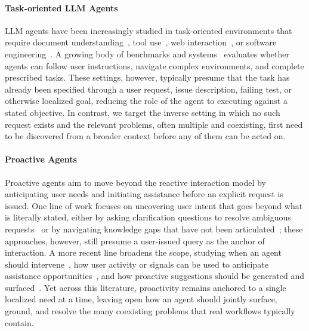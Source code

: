 \documentclass{llmxive}
\begin{document}
\paragraph{Task-oriented LLM Agents}
LLM agents have been increasingly studied in task-oriented environments that require document understanding~\cite{mmlongbench_doc}, tool use~\cite{Toolformer, ToolLLM}, web interaction~\cite{WebArena, Mind2Web}, or software engineering~\cite{SWE-agent, AutoCodeRover}. A growing body of benchmarks and systems~\cite{AgentBench, OSWorld} evaluates whether agents can follow user instructions, navigate complex environments, and complete prescribed tasks. These settings, however, typically presume that the task has already been specified through a user request, issue description, failing test, or otherwise localized goal, reducing the role of the agent to executing against a stated objective. In contrast, we target the inverse setting in which no such request exists and the relevant problems, often multiple and coexisting, first need to be discovered from a broader context before any of them can be acted on.

\paragraph{Proactive Agents}
Proactive agents aim to move beyond the reactive interaction model by anticipating user needs and initiating assistance before an explicit request is issued. One line of work focuses on uncovering user intent that goes beyond what is literally stated, either by asking clarification questions to resolve ambiguous requests~\cite{DBLP:conf/sigir/AliannejadiZCC19, Kuhn2022CLAMSC, DBLP:conf/emnlp/Zhang0RNC24, DBLP:journals/corr/abs-2511-02208, DiscoverLLM} or by navigating knowledge gaps that have not been articulated~\cite{proper}; these approaches, however, still presume a user-issued query as the anchor of interaction. A more recent line broadens the scope, studying when an agent should intervene~\cite{DBLP:conf/chi/LiuFSWIC25, DBLP:conf/emnlp/ZhangDLMKDCM25}, how user activity or signals can be used to anticipate assistance opportunities~\cite{ProactiveAgent, ContextAgent, FingerTip20K}, and how proactive suggestions should be generated and surfaced~\cite{probe}. Yet across this literature, proactivity remains anchored to a single localized need at a time, leaving open how an agent should jointly surface, ground, and resolve the many coexisting problems that real workflows typically contain.
\end{document}
